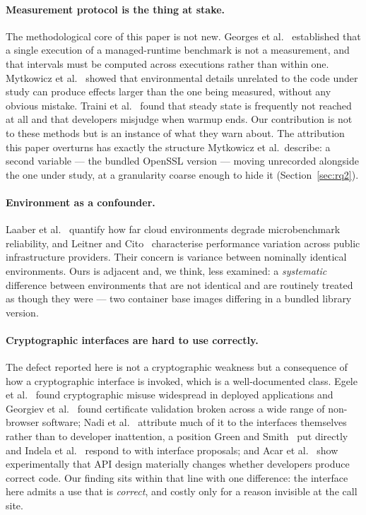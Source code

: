 \documentclass[pdflatex,sn-basic,twocolumn]{sn-jnl}%
\begin{document}
\paragraph{Measurement protocol is the thing at stake.} The methodological core
of this paper is not new. Georges et al.~\cite{georges2007statistically}
established that a single execution of a managed-runtime benchmark is not a
measurement, and that intervals must be computed across executions rather than
within one. Mytkowicz et al.~\cite{mytkowicz2009wrong} showed that
environmental details unrelated to the code under study can produce effects
larger than the one being measured, without any obvious mistake. Traini et
al.~\cite{traini2023steady} found that steady state is frequently not reached
at all and that developers misjudge when warmup ends. Our contribution is not
to these methods but is an instance of what they warn about. The attribution
this paper overturns has exactly the structure Mytkowicz et al.\ describe: a
second variable --- the bundled OpenSSL version --- moving unrecorded alongside
the one under study, at a granularity coarse enough to hide it
(Section~\ref{sec:rq2}).

\paragraph{Environment as a confounder.} Laaber et al.~\cite{laaber2019cloud}
quantify how far cloud environments degrade microbenchmark reliability, and
Leitner and Cito~\cite{leitner2016patterns} characterise performance variation
across public infrastructure providers. Their concern is variance between
nominally identical environments. Ours is adjacent and, we think, less
examined: a \emph{systematic} difference between environments that are not
identical and are routinely treated as though they were --- two container base
images differing in a bundled library version.

\paragraph{Cryptographic interfaces are hard to use correctly.} The defect
reported here is not a cryptographic weakness but a consequence of how a
cryptographic interface is invoked, which is a well-documented class. Egele et
al.~\cite{egele2013empirical} found cryptographic misuse widespread in deployed
applications and Georgiev et al.~\cite{georgiev2012dangerous} found certificate
validation broken across a wide range of non-browser software; Nadi et
al.~\cite{nadi2016jumping} attribute much of it to the interfaces themselves
rather than to developer inattention, a position Green and
Smith~\cite{green2016developers} put directly and Indela et
al.~\cite{indela2016helping} respond to with interface proposals; and Acar et
al.~\cite{acar2017comparing} show experimentally that API design materially
changes whether developers produce correct code. Our finding sits within that
line with one difference: the interface here admits a use that is
\emph{correct}, and costly only for a reason invisible at the call site.
\end{document}
